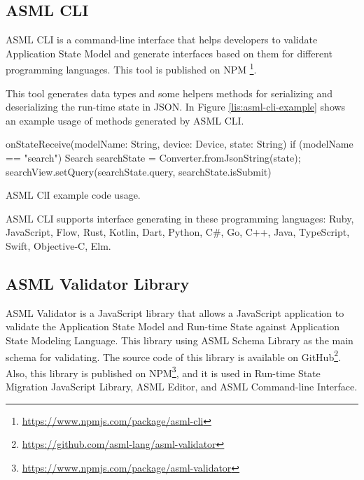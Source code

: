 \subsection{ASML CLI}
ASML CLI is a command-line interface that helps developers to validate Application State Model and generate interfaces based on them for different programming languages. This tool is published on NPM \footnote{\url{https://www.npmjs.com/package/asml-cli}}.

This tool generates data types and some helpers methods for serializing and deserializing the run-time state in JSON. In Figure \ref{lis:asml-cli-example} shows an example usage of methods generated by ASML CLI.

\FloatBarrier
\begin{code}
\begin{java}
onStateReceive(modelName: String, device: Device, state: String) {
    if (modelName == "search") {
        Search searchState = Converter.fromJsonString(state);
        searchView.setQuery(searchState.query, searchState.isSubmit)
    }
}
\end{java}
\caption{ASML ClI example code usage.}
\label{lis:asml-cli-example}
\end{code}
\FloatBarrier

ASML CLI supports interface generating in these programming languages:
Ruby, JavaScript, Flow, Rust, Kotlin, Dart, Python, C\#, Go, C++, Java, TypeScript, Swift, Objective-C, Elm.

\subsection{ASML Validator Library}
ASML Validator is a JavaScript library that allows a JavaScript application to validate the Application State Model and Run-time State against Application State Modeling Language. This library using ASML Schema Library as the main schema for validating. The source code of this library is available on GitHub\footnote{\url{https://github.com/asml-lang/asml-validator}}. Also, this library is published on NPM\footnote{\url{https://www.npmjs.com/package/asml-validator}}, and it is used in Run-time State Migration JavaScript Library, ASML Editor, and ASML Command-line Interface.

